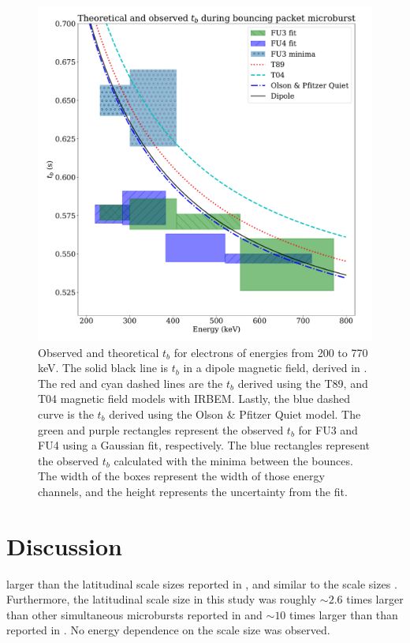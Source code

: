 \documentclass[draft, linenumbers]{agujournal}
\begin{document}
\begin{figure}
\includegraphics[width=\textwidth]{detrended_bounce_period_boxed_adj.pdf}
\caption{Observed and theoretical $t_b$ for electrons of energies from 200 to 770 keV. The solid black line is $t_b$ in a dipole magnetic field, derived in \citet{Schulz1974}. The red and cyan dashed lines are the $t_b$ derived using the T89, and T04 magnetic field models with IRBEM. Lastly, the blue dashed curve is the $t_b$ derived using the Olson \& Pfitzer Quiet model. The green and purple rectangles represent the observed $t_b$ for FU3 and FU4 using a Gaussian fit, respectively. The blue rectangles represent the observed $t_b$ calculated with the minima between the bounces. The width of the boxes represent the width of those energy channels, and the height represents the uncertainty from the fit.}
\label{tb_plot}
\end{figure}

\section{Discussion} \label{discussion}
  larger than the latitudinal scale sizes  reported in \citet{Blake1996}, and similar to the scale sizes  \citep{Parks1967}. Furthermore, the latitudinal scale size in this study was roughly $\sim 2.6$ times larger than other simultaneous microbursts reported in \citet{Crew2016} and $\sim 10$ times larger than than reported in \citet{Dietrich2010}. No energy dependence on the scale size was observed.
\end{document}
